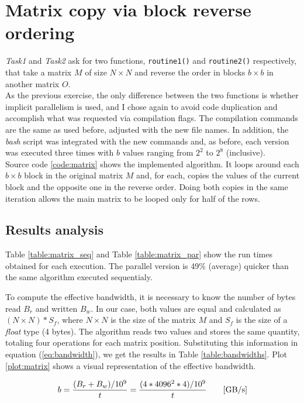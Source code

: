 \section{Matrix copy via block reverse ordering}
\textit{Task1} and \textit{Task2} ask for two functions, \texttt{routine1()} and \texttt{routine2()} respectively, that %
take a matrix $M$ of size $N\times N$ and reverse the order in blocks $b\times b$ in another matrix $O$.\\%
As the previous exercise, the only difference between the two functions is whether implicit parallelism is used, %
and I chose again to avoid code duplication and accomplish what was requested via compilation flags.
The compilation commands are the same as used before, adjusted with the new file names. In addition, the \textit{bash} %
script was integrated with the new commands and, as before, each version was executed three times with $b$ values ranging %
from $2^2$ to $2^8$ (inclusive).\\%
Source code \ref{code:matrix} shows the implemented algorithm. It loops around each $b\times b$ block in the original %
matrix $M$ and, for each, copies the values of the current block and the opposite one in the reverse order. Doing both %
copies in the same iteration allows the main matrix to be looped only for half of the rows.


\subsection*{Results analysis}
Table \ref{table:matrix_seq} and Table \ref{table:matrix_par} show the run times obtained for each execution. The parallel %
version is 49\% (average) quicker than the same algorithm executed sequentialy.%

\begin{table}[h!tb]
    \centering
    \parbox{.45\linewidth}{
    }
    \parbox{.50\linewidth}{
    }
\end{table}

To compute the effective bandwidth, it is necessary to know the number of bytes read $B_r$ and written $B_w$. In our %
case, both values are equal and calculated as $(N\times N) * S_f$, where $N\times N$ is the size of the matrix $M$ and %
$S_f$ is the size of a \textit{float} type (4 bytes). The algorithm reads two values and stores the same %
quantity, totaling four operations for each matrix position. Substituting this information in equation (\ref{eq:bandwidth}), %
we get the results in Table \ref{table:bandwidths}. Plot \ref{plot:matrix} shows a visual representation of the effective %
bandwidth.

\begin{equation}
    \label{eq:bandwidth}
    b=\frac{(B_r+B_w)/10^9}{t}=\frac{(4*4096^2*4)/10^9}{t}\qquad[\textnormal{GB/s}]
\end{equation}


